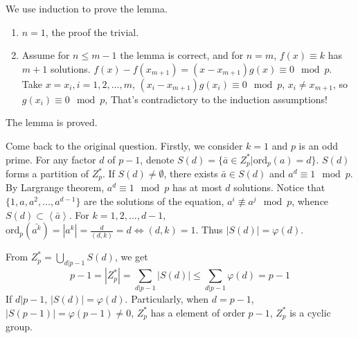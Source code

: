 \begin{answer}
    We use induction to prove the lemma.

    \begin{enumerate}
        \item $n=1$, the proof the trivial.
        \item Assume for $n\leq m-1$ the lemma is correct, and for $n= m$, $f(x)\equiv k$ has $m+1$ solutions. $f(x)-f(x_{m+1})=(x-x_{m+1})g(x)\equiv 0\mod p$. Take $x=x_{i}, i=1,2,\dots ,m$, $(x_{i}-x_{m+1})g(x_{i})\equiv 0\mod p$, $x_{i}\neq x_{m+1}$, so $g(x_{i})\equiv 0\mod p$, That's contradictory to the induction assumptions! 
    \end{enumerate}
    The lemma is proved.

    Come back to the original question. Firstly, we consider $k=1$ and $p$ is an odd prime. For any factor $d$ of $p-1$, denote $S(d)=\{\bar{a}\in Z_{p}^{*}|\mathrm{ord}_p(a)=d\}$. $S(d)$ forms a partition of $Z_{p}^{*}$. If $S(d)\neq \emptyset$, there exists $\bar{a}\in S(d)$ and $a^{d}\equiv 1\mod p$. By Largrange theorem, $a^{d}\equiv 1\mod p$ has at most $d$ solutions. Notice that $\{1,a,a^{2},\dots, a^{d-1}\}$ are the solutions of the equation, $a^{i}\not\equiv a^{j}\mod p$, whence $S(d)\subset\left\langle\bar{a}\right\rangle$. For $k=1,2,\dots,d-1$, $\mathrm{ord}_p(\bar{a^{k}})=\left| a^{k} \right| =\frac{d}{(d,k)}=d\Leftrightarrow(d,k)=1$. Thus $\left| S(d) \right| =\varphi(d)$.

    From $Z_{p}^{*}=\bigcup\limits_{d|p-1}S(d)$, we get \[p-1=\left| Z_{p}^{*} \right| =\sum\limits_{d|p-1}\left| S(d) \right| \leq \sum_{d|p-1}\varphi(d)=p-1\] If $d|p-1$, $\left| S(d) \right| =\varphi(d)$. Particularly, when $d=p-1$, $\left| S(p-1) \right| =\varphi(p-1)\neq 0$, $Z_{p}^{*}$ has a element of order $p-1$, $Z_{p}^{*}$ is a cyclic group.


\end{answer}
